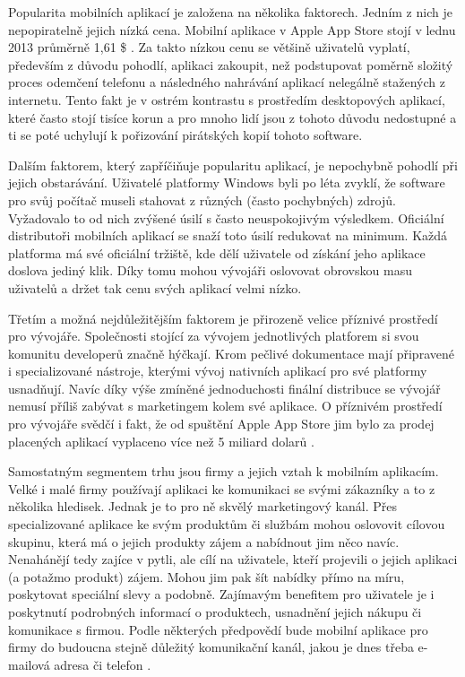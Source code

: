 Popularita mobilních aplikací je založena na několika faktorech. Jedním z nich je nepopiratelně jejich nízká cena. Mobilní aplikace v Apple App Store stojí v lednu 2013 průměrně 1,61 \$ \cite{app_store_metrics}. Za takto nízkou cenu se většině uživatelů vyplatí, především z důvodu pohodlí, aplikaci zakoupit, než podstupovat poměrně složitý proces odemčení telefonu a následného nahrávání aplikací nelegálně stažených z internetu. Tento fakt je v ostrém kontrastu s prostředím desktopových aplikací, které často stojí tisíce korun a pro mnoho lidí jsou z tohoto důvodu nedostupné a ti se poté uchylují k pořizování pirátských kopií tohoto software.

Dalším faktorem, který zapříčiňuje popularitu aplikací, je nepochybně pohodlí při jejich obstarávání. Uživatelé platformy Windows byli po léta zvyklí, že software pro svůj počítač museli stahovat z různých (často pochybných) zdrojů. Vyžadovalo to od nich zvýšené úsilí s často neuspokojivým výsledkem. Oficiální distributoři mobilních aplikací se snaží toto úsilí redukovat na minimum. Každá platforma má své oficiální tržiště, kde dělí uživatele od získání jeho aplikace doslova jediný klik. Díky tomu mohou vývojáři oslovovat obrovskou masu uživatelů a držet tak cenu svých aplikací velmi nízko.

Třetím a možná nejdůležitějším faktorem je přirozeně velice příznivé prostředí pro vývojáře. Společnosti stojící za vývojem jednotlivých platforem si svou komunitu developerů značně hýčkají. Krom pečlivé dokumentace mají připravené i specializované nástroje, kterými vývoj nativních aplikací pro své platformy usnadňují. Navíc díky výše zmíněné jednoduchosti finální distribuce se vývojář nemusí příliš zabývat s marketingem kolem své aplikace. O příznivém prostředí pro vývojáře svědčí i fakt, že od spuštění Apple App Store jim bylo za prodej placených aplikací vyplaceno více než 5 miliard dolarů \cite{comscore_report_may}.

Samostatným segmentem trhu jsou firmy a jejich vztah k mobilním aplikacím. Velké i malé firmy používají aplikaci ke komunikaci se svými zákazníky a to z několika hledisek. Jednak je to pro ně skvělý marketingový kanál. Přes specializované aplikace ke svým produktům či službám mohou oslovovit cílovou skupinu, která má o jejich produkty zájem a nabídnout jim něco navíc. Nenahánějí tedy zajíce v pytli, ale cílí na uživatele, kteří projevili o jejich aplikaci (a potažmo produkt) zájem. Mohou jim pak šít nabídky přímo na míru, poskytovat speciální slevy a podobně. Zajímavým benefitem pro uživatele je i poskytnutí podrobných informací o produktech, usnadnění jejich nákupu či komunikace s firmou. Podle některých předpovědí bude mobilní aplikace pro firmy do budoucna stejně důležitý komunikační kanál, jakou je dnes třeba e-mailová adresa či telefon \cite{forbes_business_checklist}.
